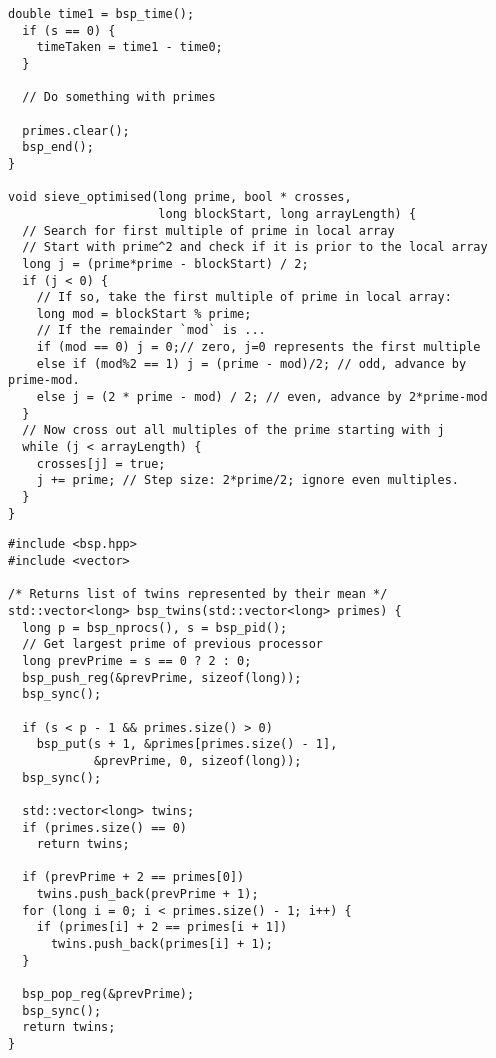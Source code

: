 \documentclass[a4paper,12pt]{article}
\begin{document}
\begin{lstlisting}[caption={Optimised parallel program for the Sieve of Eratosthenes}, label={prg:par_opt_sieve}, frame={single}]
  double time1 = bsp_time();
  if (s == 0) {
    timeTaken = time1 - time0;
  }
  
  // Do something with primes

  primes.clear();
  bsp_end();
}

void sieve_optimised(long prime, bool * crosses,
                     long blockStart, long arrayLength) {
  // Search for first multiple of prime in local array
  // Start with prime^2 and check if it is prior to the local array
  long j = (prime*prime - blockStart) / 2;
  if (j < 0) {
    // If so, take the first multiple of prime in local array:
    long mod = blockStart % prime;
    // If the remainder `mod` is ...
    if (mod == 0) j = 0;// zero, j=0 represents the first multiple
    else if (mod%2 == 1) j = (prime - mod)/2; // odd, advance by prime-mod.
    else j = (2 * prime - mod) / 2; // even, advance by 2*prime-mod
  }
  // Now cross out all multiples of the prime starting with j
  while (j < arrayLength) {
    crosses[j] = true;
    j += prime; // Step size: 2*prime/2; ignore even multiples.
  }
}
	\end{lstlisting}

	\begin{lstlisting}[caption={Extension function for finding prime twins}, label={prg:par_opt_sieve}, frame={single}]
#include <bsp.hpp>
#include <vector>

/* Returns list of twins represented by their mean */
std::vector<long> bsp_twins(std::vector<long> primes) {
  long p = bsp_nprocs(), s = bsp_pid();
  // Get largest prime of previous processor
  long prevPrime = s == 0 ? 2 : 0;
  bsp_push_reg(&prevPrime, sizeof(long));
  bsp_sync();

  if (s < p - 1 && primes.size() > 0)
    bsp_put(s + 1, &primes[primes.size() - 1],
            &prevPrime, 0, sizeof(long));
  bsp_sync();

  std::vector<long> twins;
  if (primes.size() == 0)
    return twins;

  if (prevPrime + 2 == primes[0])
    twins.push_back(prevPrime + 1);
  for (long i = 0; i < primes.size() - 1; i++) {
    if (primes[i] + 2 == primes[i + 1])
      twins.push_back(primes[i] + 1);
  }

  bsp_pop_reg(&prevPrime);
  bsp_sync();
  return twins;
}
	\end{lstlisting}
	
\end{document}
